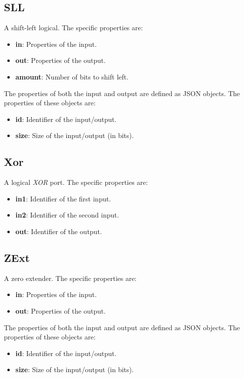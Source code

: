 \documentclass[11pt,a4paper,twoside,titlepage]{report}
\begin{document}
\subsection{SLL}

A shift-left logical. The specific properties are:
\begin{itemize}
	\item \textbf{in}: Properties of the input.
	\item \textbf{out}: Properties of the output.
	\item \textbf{amount}: Number of bits to shift left.
\end{itemize}

The properties of both the input and output are defined as JSON objects. 
The properties of these objects are:
\begin{itemize}
	\item \textbf{id}: Identifier of the input/output.
	\item \textbf{size}: Size of the input/output (in bits).
\end{itemize}

\subsection{Xor}

A logical \textit{XOR} port. The specific properties are:
\begin{itemize}
	\item \textbf{in1}: Identifier of the first input.
	\item \textbf{in2}: Identifier of the second input.
	\item \textbf{out}: Identifier of the output.
\end{itemize}

\subsection{ZExt}

A zero extender. The specific properties are:
\begin{itemize}
	\item \textbf{in}: Properties of the input.
	\item \textbf{out}: Properties of the output.
\end{itemize}

The properties of both the input and output are defined as JSON objects. 
The properties of these objects are:
\begin{itemize}
	\item \textbf{id}: Identifier of the input/output.
	\item \textbf{size}: Size of the input/output (in bits).
\end{itemize}
\end{document}
